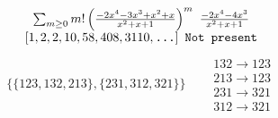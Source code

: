 \begin{tiny}
\begin{align}
\begin{matrix}
\end{matrix}
\end{align}
$$
\begin{matrix}
\sum_{m \geq 0} m! \left(
\frac{-2 x^{4} - 3 x^{3} + x^{2} + x}{x^{2} + x + 1}
\right)^m
\ 
\frac{-2 x^{4} - 4 x^{3}}{x^{2} + x + 1}
\\
\left[1, 2, 2, 10, 58, 408, 3110, \text{\texttt{...}}\right]
\ 
\texttt{Not present}
\end{matrix}
$$
\vspace{-1em}
\begin{align}
\{\{123, 132, 213\}, \{231, 312, 321\}\}
\quad
&
\begin{matrix}
132 \to 123\\213 \to 123\\231 \to 321\\312 \to 321
\end{matrix}
\end{align}
\end{tiny}
